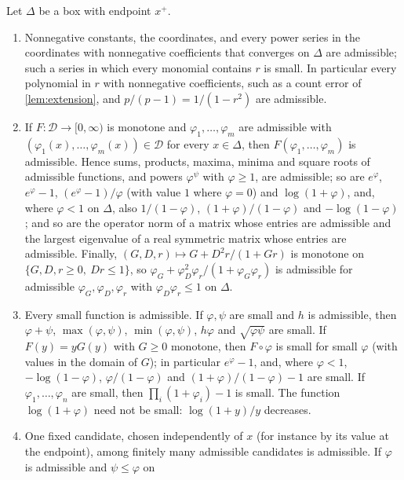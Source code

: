\begin{lemma}\label{lem:majorant}
Let $\Delta$ be a box with endpoint $x^+$.
\begin{enumerate}[label=\textup{(\roman*)}]
\item Nonnegative constants, the coordinates, and every power series in the
 coordinates with nonnegative coefficients that converges on $\Delta$ are
 admissible; such a series in which every monomial contains $r$ is small. In
 particular every polynomial in $r$ with nonnegative coefficients, such as a
 count error of \cref{lem:extension}, and $p/(p-1)=1/(1-r^2)$ are admissible.
\item If $F\colon\mathcal D\to[0,\infty)$ is monotone and
 $\varphi_1,\dots,\varphi_m$ are admissible with
 $(\varphi_1(x),\dots,\varphi_m(x))\in\mathcal D$ for every $x\in\Delta$, then
 $F(\varphi_1,\dots,\varphi_m)$ is admissible. Hence sums, products, maxima,
 minima and square roots of admissible functions, and powers $\varphi^\psi$
 with $\varphi\ge1$, are admissible; so are $e^\varphi$, $e^\varphi-1$,
 $(e^\varphi-1)/\varphi$ (with value $1$ where $\varphi=0$) and
 $\log(1+\varphi)$, and, where $\varphi<1$ on $\Delta$, also $1/(1-\varphi)$,
 $(1+\varphi)/(1-\varphi)$ and $-\log(1-\varphi)$; and so are the operator
 norm of a matrix whose entries are admissible and the largest eigenvalue of
 a real symmetric matrix whose entries are admissible. Finally,
 $(G,D,r)\mapsto G+D^2r/(1+Gr)$ is monotone on
 $\{G,D,r\ge0,\ Dr\le1\}$, so $\varphi_G+\varphi_D^2\varphi_r/(1+\varphi_G\varphi_r)$
 is admissible for admissible $\varphi_G,\varphi_D,\varphi_r$ with
 $\varphi_D\varphi_r\le1$ on $\Delta$.
\item Every small function is admissible. If $\varphi,\psi$ are small and
 $h$ is admissible, then $\varphi+\psi$, $\max(\varphi,\psi)$,
 $\min(\varphi,\psi)$, $h\varphi$ and $\sqrt{\varphi\psi}$ are small. If
 $F(y)=yG(y)$ with $G\ge0$ monotone, then $F\circ\varphi$ is small for small
 $\varphi$ (with values in the domain of $G$); in particular $e^\varphi-1$,
 and, where $\varphi<1$, $-\log(1-\varphi)$, $\varphi/(1-\varphi)$ and
 $(1+\varphi)/(1-\varphi)-1$ are small. If $\varphi_1,\dots,\varphi_n$ are
 small, then $\prod_i(1+\varphi_i)-1$ is small. The function $\log(1+\varphi)$
 need not be small: $\log(1+y)/y$ decreases.
\item One fixed candidate, chosen independently of $x$ (for instance by
 its value at the endpoint), among finitely many admissible candidates is admissible. If $\varphi$ is admissible and $\psi\le\varphi$ on

\end{enumerate}
\end{lemma}
